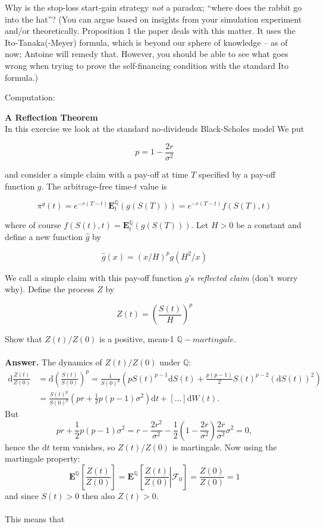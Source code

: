 \documentclass[a4paper]{article}
\begin{document}
Why is the stop-loss start-gain strategy \textit{not} a paradox; ``where does the rabbit go into the hat''? (You can argue based on insights from your simulation experiment and/or theoretically. Proposition 1 the paper deals with this matter. It uses the Ito-Tanaka(-Meyer) formula, which is beyond our sphere of knowledge -- as of now; Antoine will remedy that. However, you should be able to see what goes wrong when trying to prove the self-financing condition with the standard Ito formula.)

\vspace{0.2cm}
Computation:

\vspace{0.4cm}
{\Large{\textbf{A Reflection Theorem}}}\\
\vspace{0.2cm}
In this exercise we look at the standard no-dividends Black-Scholes model We put

$$p = 1-\frac{2r}{\sigma^2}$$

and consider a simple claim with a pay-off at time $T$ specified by a pay-off function $g$. The arbitrage-free time-$t$ value is

$$\pi^{g}\left(t\right)=e^{-r\left(T-t\right)}\mathbf{E}^{\mathbb{Q}}_{t}\left(g\left(S\left(T\right)\right)\right)=e^{-r\left(T-t\right)}f\left(S\left(T\right),t\right)$$

where of course $f\left(S\left(t\right),t\right)=\mathbf{E}^{\mathbb{Q}}_{t}\left(g\left(S\left(T\right)\right)\right)$. Let $H > 0$ be a constant and define a new function $\hat{g}$ by

$$\hat{g}\left(x\right)=\left(x/H\right)^{p}g\left(H^{2}/x\right)$$

We call a simple claim with this pay-off function $g$'s \textit{reflected claim} (don't worry why).
Define the process $Z$ by

$$Z\left(t\right) = \left(\frac{S\left(t\right)}{H}\right)^{p}$$

Show that $Z\left(t\right)/Z\left(0\right)$ is a positive, mean-1 $\mathbb{Q}-martingale$.\\
\\
\textbf{Answer.} The dynamics of $Z(t)/Z(0)$ under $\mathbb{Q}$:
\begin{align*}
\text{d}\frac{Z(t)}{Z(0)} &= \text{d}\left(\frac{S(t)}{S(0)}\right)^p=\frac{1}{S(0)^p}\left(pS(t)^{p-1}\text{d}S(t)+\frac{p(p-1)}{2}S(t)^{p-2}(\text{d}S(t))^2\right)\\
&=\frac{S(t)^p}{S(0)^p}\left(pr+\frac{1}{2}p(p-1)\sigma^2\right)\text{d}t+[\ldots]\text{d}W(t).
\end{align*}
But
$$
pr+\frac{1}{2}p(p-1)\sigma^2=r-\frac{2r^2}{\sigma^2}-\frac{1}{2}\left(1-\frac{2r}{\sigma^2}\right)\frac{2r}{\sigma^2}\sigma^2=0,
$$
hence the $\text{d}t$ term vanishes, so $Z(t)/Z(0)$ is martingale. Now using the martingale property:
$$
\mathbf{E}^{\mathbb{Q}}\left[\frac{Z(t)}{Z(0)}\right]=\left.\mathbf{E}^{\mathbb{Q}}\left[\frac{Z(t)}{Z(0)}\right|\mathcal{F}_0\right]=\frac{Z(0)}{Z(0)}=1
$$
and since $S(t)>0$ then also $Z(t)>0$.\\
\\
This means that
\end{document}
